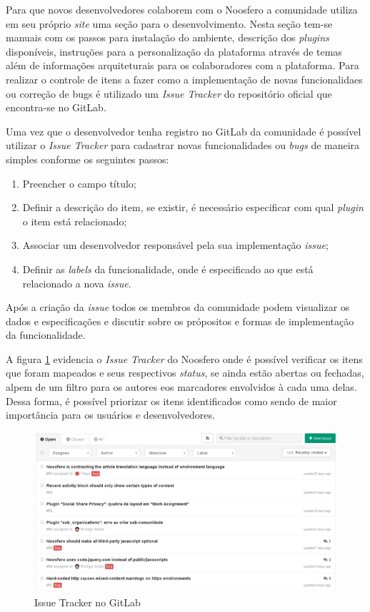Para que novos desenvolvedores colaborem com o Noosfero a comunidade utiliza em seu próprio \textit{site} uma seção para o desenvolvimento. Nesta seção tem-se manuais com os passos para instalação do ambiente, descrição dos \textit{plugins} disponíveis, instruções para a personalização da plataforma através de temas além de informações arquiteturais para os colaboradores com a plataforma. Para realizar o controle de itens a fazer como a implementação de novas funcionalidaes ou correção de bugs é utilizado um \textit{Issue Tracker} do repositório oficial que encontra-se no GitLab.

Uma vez que o desenvolvedor tenha registro no GitLab da comunidade é possível utilizar o \textit{Issue Tracker} para cadastrar novas funcionalidades ou \textit{bugs} de maneira simples conforme os seguintes passos:

\begin{enumerate}
\item Preencher o campo título;
\item Definir a descrição do item, se existir, é necessário especificar com qual \textit{plugin} o item está relacionado;
\item Associar um desenvolvedor responsável pela sua implementação \textit{issue};
\item Definir as \textit{labels} da funcionalidade, onde é especificado ao que está relacionado a nova \textit{issue}.
\end{enumerate}

Após a criação da \textit{issue} todos os membros da comunidade podem visualizar os dados e especificações e discutir sobre os própositos e formas de implementação da funcionalidade.

A figura \ref{issue-tracker} evidencia o \textit{Issue Tracker} do Noosfero onde é possível verificar os itens que foram mapeados e seus respectivos \textit{status}, se ainda estão abertas ou fechadas, alpem de um filtro para os autores eos marcadores envolvidos à cada uma delas. Dessa forma, é possível priorizar os itens identificados como sendo de maior importância para os usuários e desenvolvedores.

\begin{figure}[h]
    \centering
    \includegraphics[keepaspectratio=true,scale=0.4]
      {figuras/issueTrackerGitLab.eps}
    \caption{Issue Tracker no GitLab}
    \label{issue-tracker}
\end{figure}

